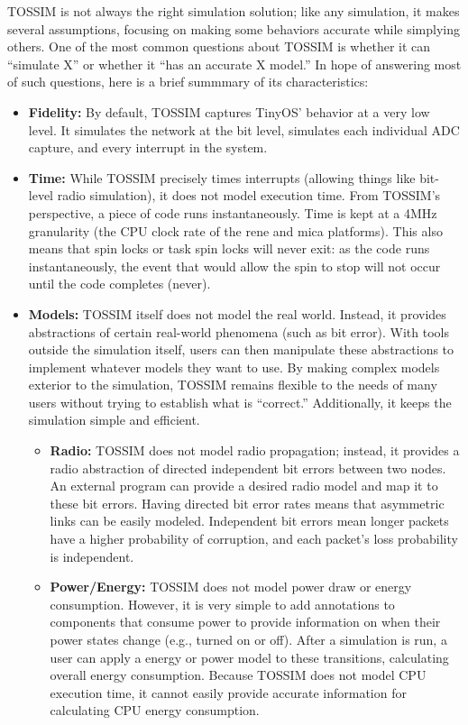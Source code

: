 \documentclass[10pt,fleqn]{article}
\def\sim{TOSSIM\xspace}
\begin{document}
\sim is not always the right simulation solution; like any
simulation, it makes several assumptions, focusing on making some
behaviors accurate while simplying others. One of the most common
questions about \sim is whether it can ``simulate X'' or whether it
``has an accurate X model.'' In hope of answering most of such
questions, here is a brief summmary of its characteristics:

\begin{itemize}

\item{\bf Fidelity:} By default, \sim captures TinyOS' behavior at a
very low level. It simulates the network at the bit level, simulates
each individual ADC capture, and every interrupt in the system.

\item{\bf Time:} While \sim precisely times interrupts (allowing
things like bit-level radio simulation), it does not model execution
time. From \sim's perspective, a piece of code runs
instantaneously. Time is kept at a 4MHz granularity (the CPU clock
rate of the rene and mica platforms). This also means that spin locks
or task spin locks will never exit: as the code runs instantaneously,
the event that would allow the spin to stop will not occur until the
code completes (never).

\item{\bf Models:} \sim itself does not model the real world. Instead,
it provides abstractions of certain real-world phenomena (such as bit
error). With tools outside the simulation itself, users can then
manipulate these abstractions to implement whatever models they want
to use. By making complex models exterior to the simulation, \sim
remains flexible to the needs of many users without trying to
establish what is ``correct.'' Additionally, it keeps the simulation
simple and efficient.

\begin{itemize}
\item{\bf Radio:} \sim does not model radio propagation;
instead, it provides a radio abstraction of directed independent bit
errors between two nodes. An external program can provide a desired
radio model and map it to these bit errors. Having directed bit error
rates means that asymmetric links can be easily modeled. Independent
bit errors mean longer packets have a higher probability of
corruption, and each packet's loss probability is independent.

\item{\bf Power/Energy:} \sim does not model power draw or energy
consumption. However, it is very simple to add annotations to
components that consume power to provide information on when their
power states change (e.g., turned on or off). After a simulation is
run, a user can apply a energy or power model to these transitions,
calculating overall energy consumption. Because \sim does not model
CPU execution time, it cannot easily provide accurate information for
calculating CPU energy consumption.
\end{itemize}


\end{itemize}
\end{document}
